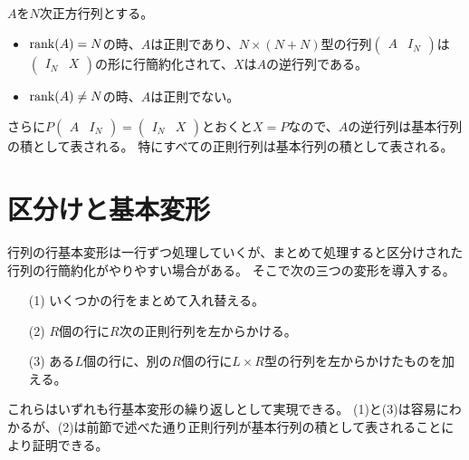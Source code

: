 \begin{theorem}[逆行列の計算]
$A$を$N$次正方行列とする。
\begin{itemize}
\item
$\rank(A) = N$の時、$A$は正則であり、$N\times (N+N)$型の行列$\begin{pmatrix}A & I_N\end{pmatrix}$は$\begin{pmatrix}I_N & X\end{pmatrix}$の形に行簡約化されて、$X$は$A$の逆行列である。
\item
$\rank(A) \ne N$の時、$A$は正則でない。
\end{itemize}
\end{theorem}

\begin{remark}
さらに$P\begin{pmatrix}A & I_N\end{pmatrix} = \begin{pmatrix}I_N & X\end{pmatrix}$とおくと$X = P$なので、$A$の逆行列は基本行列の積として表される。
特にすべての正則行列は基本行列の積として表される。
\end{remark}

\section{区分けと基本変形}

行列の行基本変形は一行ずつ処理していくが、まとめて処理すると区分けされた行列の行簡約化がやりやすい場合がある。
そこで次の三つの変形を導入する。

\begin{itemize}
\item[(1)]
いくつかの行をまとめて入れ替える。
\item[(2)]
$R$個の行に$R$次の正則行列を左からかける。
\item[(3)]
ある$L$個の行に、別の$R$個の行に$L\times R$型の行列を左からかけたものを加える。
\end{itemize}

これらはいずれも行基本変形の繰り返しとして実現できる。
(1)と(3)は容易にわかるが、(2)は前節で述べた通り正則行列が基本行列の積として表されることにより証明できる。

